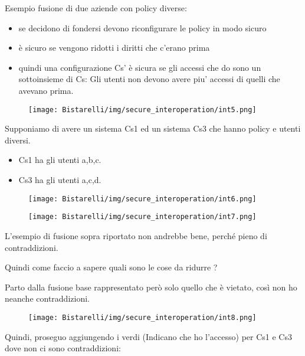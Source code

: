 Esempio fusione di due aziende con policy diverse:
\begin{itemize}
    \item se decidono di fondersi devono riconfigurare le policy in modo sicuro
    
    \item è sicuro se vengono ridotti i diritti che c’erano prima
    
    \item quindi una configurazione Cs’ è sicura se gli accessi che do sono un sottoinsieme di Cs: Gli utenti non devono avere piu' accessi di quelli che avevano prima. 
\end{itemize}
\begin{figure}[H]
	\centering
    \texttt{[image: Bistarelli/img/secure\_interoperation/int5.png]}
\end{figure}
Supponiamo di avere un sistema Cs1 ed un sistema Cs3 che hanno policy e utenti diversi.
\begin{itemize}
    \item Cs1 ha gli utenti a,b,c.
    
    \item Cs3 ha gli utenti a,c,d.
\end{itemize}
\begin{figure}[H]
	\centering
    \texttt{[image: Bistarelli/img/secure\_interoperation/int6.png]}
\end{figure}
\begin{figure}[H]
	\centering
    \texttt{[image: Bistarelli/img/secure\_interoperation/int7.png]}
\end{figure}
L’esempio di fusione sopra riportato non andrebbe bene, perché pieno di contraddizioni.

\singlespacing

Quindi come faccio a sapere quali sono le cose da ridurre ?

\singlespacing

Parto dalla fusione base rappresentato però solo quello che è vietato, così non ho neanche contraddizioni.

\begin{figure}[H]
	\centering
    \texttt{[image: Bistarelli/img/secure\_interoperation/int8.png]}
\end{figure}

Quindi, proseguo aggiungendo i verdi (Indicano che ho l'accesso) per Cs1 e Cs3 dove non ci sono contraddizioni:

